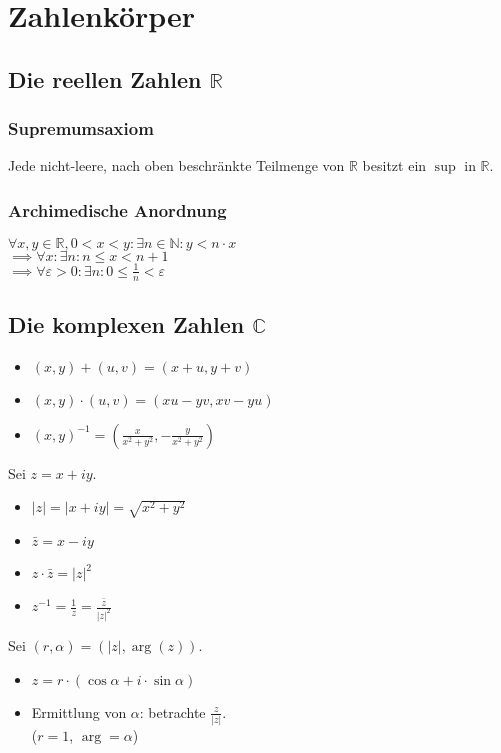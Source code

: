 \section*{Zahlenkörper}

\subsection*{Die reellen Zahlen $\mathbb{R}$}

\subsubsection*{Supremumsaxiom}
Jede nicht-leere, nach oben beschränkte Teilmenge von $\mathbb{R}$
besitzt ein $\sup$ in $\mathbb{R}$.

\subsubsection*{Archimedische Anordnung}
$\forall x,y\in\mathbb{R}, 0<x<y: \exists n\in\mathbb{N}: y<n\cdot x$ \\
$\implies \forall x:\exists n: n \le x < n+1$ \\
$\implies \forall \varepsilon>0:\exists n: 0 \le \frac{1}{n} < \varepsilon$

\subsection*{Die komplexen Zahlen $\mathbb{C}$}
\begin{itemize}
	\item $(x,y)+(u,v) = (x+u,y+v)$
	\item $(x,y)\cdot(u,v) = (xu-yv,xv-yu)$
	\item $(x,y)^{-1} = (\frac{x}{x^2+y^2}, -\frac{y}{x^2+y^2})$
\end{itemize}

Sei $z=x+iy$.
\begin{itemize}
	\item $|z|=|x+iy|=\sqrt{x^2+y^2}$
	\item $\bar{z} = x-iy$
	\item $z\cdot\bar{z}=|z|^2$
	\item $z^{-1}=\frac{1}{z}=\frac{\bar{z}}{|z|^2}$
\end{itemize}

Sei $(r,\alpha)=(|z|, \arg(z))$.
\begin{itemize}
	\item $z = r\cdot(\cos\alpha + i\cdot\sin\alpha)$
	\item Ermittlung von $\alpha$: betrachte $\frac{z}{|z|}$. \\
		($r=1$, $\arg = \alpha$)
\end{itemize}
